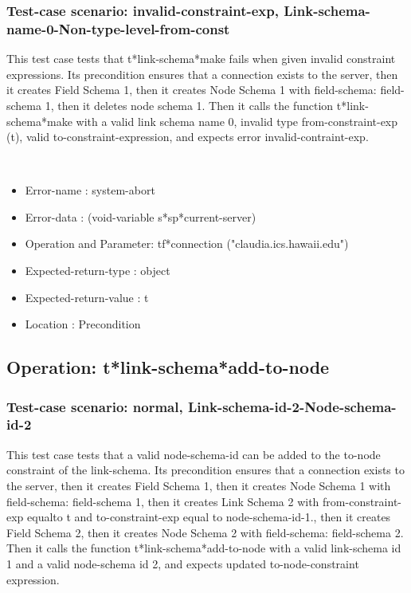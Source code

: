 \subsubsection {Test-case scenario: invalid-constraint-exp, Link-schema-name-0-Non-type-level-from-const}


This test case tests that t*link-schema*make fails when given invalid constraint expressions.
Its precondition ensures that a connection exists to the server, then it creates Field Schema 1, then it creates Node Schema 1 with field-schema: field-schema 1, then it deletes node schema 1.
Then it calls the function t*link-schema*make  with a valid link schema name 0, invalid type from-constraint-exp (t), valid to-constraint-expression, and expects error invalid-contraint-exp.



\
\begin {itemize}
\item 	Error-name             : system-abort
\item Error-data             : (void-variable s*sp*current-server)
\item Operation and Parameter: tf*connection ("claudia.ics.hawaii.edu")
\item Expected-return-type   : object
\item Expected-return-value  : t
\item Location               : Precondition



\end {itemize}
\subsection {Operation: t*link-schema*add-to-node}
\subsubsection {Test-case scenario: normal, Link-schema-id-2-Node-schema-id-2}


This test case tests that a valid node-schema-id can be added to the to-node constraint of the link-schema.
Its precondition ensures that a connection exists to the server, then it creates Field Schema 1, then it creates Node Schema 1 with field-schema: field-schema 1, then it creates Link Schema 2 with from-constraint-exp equalto t and to-constraint-exp equal to node-schema-id-1., then it creates Field Schema 2, then it creates Node Schema 2 with field-schema: field-schema 2.
Then it calls the function t*link-schema*add-to-node  with a valid link-schema id 1 and a valid node-schema id 2, and expects updated to-node-constraint expression.



